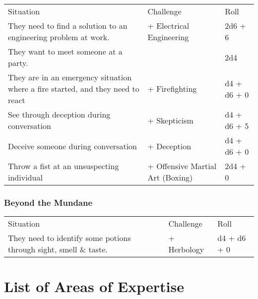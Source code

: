 \begin{center}
	\begin{xltabular}{\textwidth}{Xll}
		Situation																		& Challenge 												& Roll \\
		They need to find a solution to an engineering problem at work.					&  + Electrical Engineering				& 2d6 + 6 \\
		They want to meet someone at a party.											& 								& 2d4 \\
		They are in an emergency situation where a fire started, and they need to react	&  + Firefighting 			& d4 + d6 + 0 \\
		See through deception during conversation										&  + Skepticism							& d4 + d6 + 5 \\
		Deceive someone during conversation 											&  + Deception						& d4 + d6 + 0 \\
		Throw a fist at an unsuspecting individual										&  + Offensive Martial Art (Boxing)	& 2d4 + 0 \\
	\end{xltabular}
\end{center}

\subsubsection*{Beyond the Mundane}

\begin{center}
	\begin{xltabular}{\textwidth}{Xll}
		Situation												& Challenge 								& Roll \\
		They need to identify some potions through sight, smell \& taste. 				&  + Herbology		& d4 + d6 + 0 \\
	\end{xltabular}
\end{center}

\pagebreak
\section*{List of Areas of Expertise}


